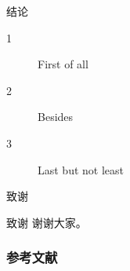 \documentclass[hyperref,UTF8,11pt,aspectratio=169]{beamer}
\begin{document}
\begin{frame}{结论}
    \begin{description}
        \item[1] First of all
        \item[2] Besides
        \item[3] Last but not least
    \end{description}
\end{frame}

\begin{frame}{致谢}
    \begin{block}{致谢}
        谢谢大家。
    \end{block}
\end{frame}

\begin{frame}[allowframebreaks]
    \frametitle{参考文献}
    \printbibliography
\end{frame}
\end{document}
